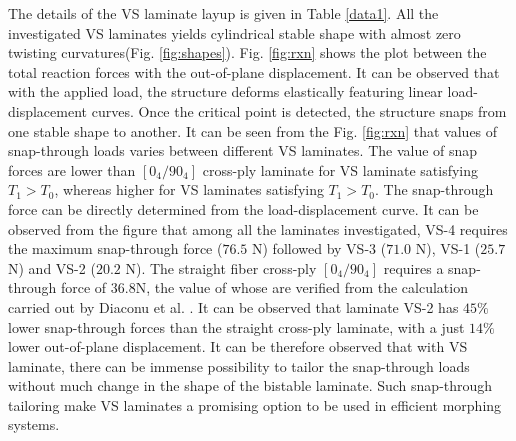 \documentclass[journal]{new-aiaa}
\begin{document}
The details of the VS laminate layup is given in Table \ref{data1}. All the investigated VS laminates yields cylindrical stable shape with almost zero twisting curvatures(Fig. \ref{fig:shapes}).  Fig. \ref{fig:rxn} shows the plot between the total reaction forces with the out-of-plane displacement. It can be observed that with the applied load, the structure deforms elastically featuring linear load-displacement curves. Once the critical point is detected, the structure snaps from one stable shape to another. It can be seen from the Fig. \ref{fig:rxn} that values of snap-through loads varies between different VS laminates. The value of snap forces are lower than $[0_4/90_4]$ cross-ply laminate for VS laminate satisfying $T_1>T_0$, whereas higher for VS laminates satisfying $T_1>T_0$. 
The snap-through force can be directly determined from the load-displacement curve. It can be observed from the figure that among all the laminates investigated, VS-4 requires the maximum snap-through force ($76.5$ N) followed by VS-3 ($71.0$ N), VS-1 ($25.7$ N) and VS-2 ($20.2$ N). The straight fiber cross-ply $[0_4/90_4]$ requires a snap-through force of $36.8$N, the value of whose are verified from the calculation carried out by Diaconu et al. \cite{Diaconu2009}. It can be observed that laminate VS-2 has $45\%$ lower snap-through forces than the straight cross-ply laminate, with a just $14\%$ lower out-of-plane displacement. It can be therefore observed that with VS laminate, there can be immense possibility to tailor the snap-through loads without much change in the shape of the bistable laminate. Such snap-through tailoring make VS laminates a promising option to be used in efficient morphing systems.
\end{document}
